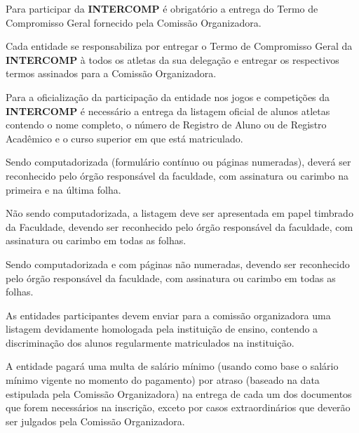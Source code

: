 \begin{article}
	Para participar da \textbf{INTERCOMP} é obrigatório a entrega do Termo de Compromisso Geral fornecido pela Comissão Organizadora.

	\begin{xparagraph}
		Cada entidade se responsabiliza por entregar o Termo de Compromisso Geral da \textbf{INTERCOMP} à todos os atletas da sua delegação e entregar os respectivos termos assinados para a Comissão Organizadora.
	\end{xparagraph}
\end{article}

\begin{article}
    \label{art:listagemoficial}
	Para a oficialização da participação da entidade nos jogos e competições da \textbf{INTERCOMP} é necessário a entrega da listagem oficial de alunos atletas contendo o nome completo, o número de Registro de Aluno ou de Registro Acadêmico e o curso superior em que está matriculado.

	\begin{xparagraph}
		Sendo computadorizada (formulário contínuo ou páginas numeradas), deverá ser reconhecido pelo órgão responsável da faculdade, com assinatura ou carimbo na primeira e na última folha.
	\end{xparagraph}

	\begin{xparagraph}
		Não sendo computadorizada, a listagem deve ser apresentada em papel timbrado da Faculdade, devendo ser reconhecido pelo órgão responsável da faculdade, com assinatura ou carimbo em todas as folhas.
	\end{xparagraph}

	\begin{xparagraph}
		Sendo computadorizada e com páginas não numeradas, devendo ser reconhecido pelo órgão responsável da faculdade, com assinatura ou carimbo em todas as folhas.
	\end{xparagraph}

	\begin{xparagraph}
    	As entidades participantes devem enviar para a comissão organizadora uma listagem devidamente homologada pela instituição de ensino, contendo a discriminação dos alunos regularmente matriculados na instituição.
	\end{xparagraph}

	\begin{xparagraph}
	    A entidade pagará uma multa de  salário mínimo (usando como base o salário mínimo vigente no momento do pagamento) por atraso (baseado na data estipulada pela Comissão Organizadora) na entrega de cada um dos documentos que forem necessários na inscrição, exceto por casos extraordinários que deverão ser julgados pela Comissão Organizadora.
	\end{xparagraph}


\end{article}
